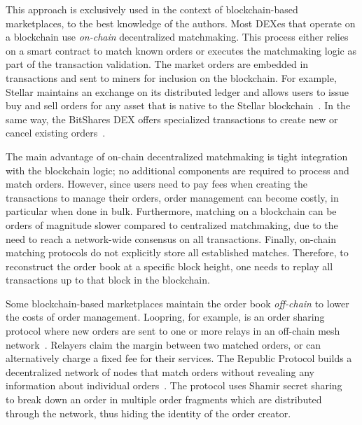 This approach is exclusively used in the context of blockchain-based marketplaces, to the best knowledge of the authors.
Most DEXes that operate on a blockchain use \emph{on-chain} decentralized matchmaking.
This process either relies on a smart contract to match known orders or executes the matchmaking logic as part of the transaction validation.
The market orders are embedded in transactions and sent to miners for inclusion on the blockchain.
For example, Stellar maintains an exchange on its distributed ledger and allows users to issue buy and sell orders for any asset that is native to the Stellar blockchain~\cite{lokhava2019fast}.
In the same way, the BitShares DEX offers specialized transactions to create new or cancel existing orders~\cite{schuh2015bitshares}.

The main advantage of on-chain decentralized matchmaking is tight integration with the blockchain logic; no additional components are required to process and match orders.
However, since users need to pay fees when creating the transactions to manage their orders, order management can become costly, in particular when done in bulk.
Furthermore, matching on a blockchain can be orders of magnitude slower compared to centralized matchmaking, due to the need to reach a network-wide consensus on all transactions.
Finally, on-chain matching protocols do not explicitly store all established matches.
Therefore, to reconstruct the order book at a specific block height, one needs to replay all transactions up to that block in the blockchain.

Some blockchain-based marketplaces maintain the order book \emph{off-chain} to lower the costs of order management.
Loopring, for example, is an order sharing protocol where new orders are sent to one or more relays in an off-chain mesh network~\cite{loopring}.
Relayers claim the margin between two matched orders, or can alternatively charge a fixed fee for their services.
The Republic Protocol builds a decentralized network of nodes that match orders without revealing any information about individual orders~\cite{zhang2017republic}.
The protocol uses Shamir secret sharing~\cite{shamir1979share} to break down an order in multiple order fragments which are distributed through the network, thus hiding the identity of the order creator.

